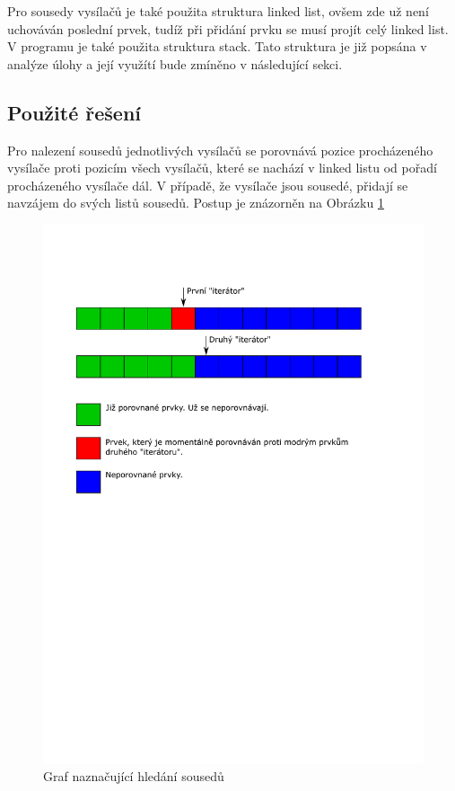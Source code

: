 \documentclass[12pt]{article}
\begin{document}
Pro sousedy vysílačů je také použita struktura linked list, ovšem zde už není 
uchováván poslední prvek, tudíž při přidání prvku se musí projít celý linked
list.\\

V programu je také použita struktura stack. Tato struktura je již popsána v 
analýze úlohy a její využítí bude zmíněno v následující sekci.
%
\subsection{Použité řešení}
%
Pro nalezení sousedů jednotlivých vysílačů se porovnává pozice procházeného
vysílače proti pozicím všech vysílačů, které se nachází v linked listu od 
pořadí procházeného vysílače dál. V případě, že vysílače jsou sousedé, přidají
se navzájem do svých listů sousedů. Postup je znázorněn na
Obrázku \ref{img:neighbors}\\ 
%
\begin{figure}[H]
        \centering
	\includegraphics[width=\textwidth, trim={0 15cm 0 4cm}]{img/neighbor_finding.pdf}
        \caption{Graf naznačující hledání sousedů}
        \label{img:neighbors}
\end{figure}
\end{document}
